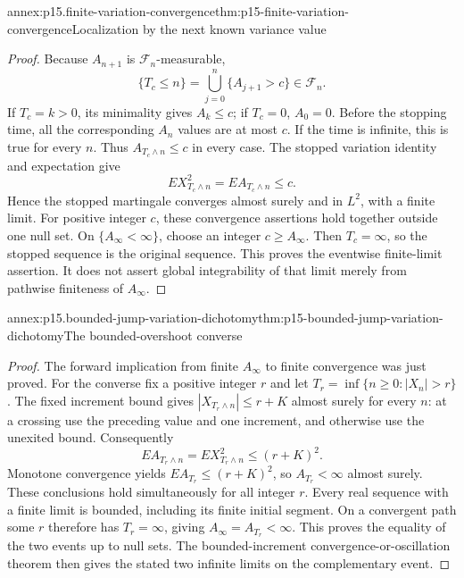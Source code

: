 \begin{annexitem}{annex:p15.finite-variation-convergence}{thm:p15-finite-variation-convergence}{Localization by the next known variance value}
\begin{proof}
Because \(A_{n+1}\) is \(\mathcal F_n\)-measurable,
\[
                 \{T_c\leq n\}
                    =\bigcup_{j=0}^n\{A_{j+1}>c\}\in\mathcal F_n.
\]
If \(T_c=k>0\), its minimality gives \(A_k\leq c\);
if \(T_c=0\), \(A_0=0\).
Before the stopping time, all the corresponding \(A_n\) values
are at most \(c\). If the time is infinite, this is true
for every \(n\). Thus \(A_{T_c\wedge n}\leq c\) in every case.
The stopped variation identity and expectation give
\[
                             EX_{T_c\wedge n}^2
                                  =EA_{T_c\wedge n}\leq c.
\]
Hence the stopped martingale converges almost surely and in
\(L^2\), with a finite limit.
For positive integer \(c\), these convergence assertions hold
together outside one null set.
On \(\{A_\infty<\infty\}\), choose an integer \(c\geq A_\infty\).
Then \(T_c=\infty\), so the stopped sequence is the original
sequence. This proves the eventwise finite-limit assertion.
It does not assert global integrability of that limit merely
from pathwise finiteness of \(A_\infty\).
\end{proof}
\end{annexitem}

\begin{annexitem}{annex:p15.bounded-jump-variation-dichotomy}{thm:p15-bounded-jump-variation-dichotomy}{The bounded-overshoot converse}
\begin{proof}
The forward implication from finite \(A_\infty\) to finite
convergence was just proved.
For the converse fix a positive integer \(r\) and let
\(T_r=\inf\{n\geq0:|X_n|>r\}\).
The fixed increment bound gives
\(|X_{T_r\wedge n}|\leq r+K\) almost surely for every \(n\):
at a crossing use the preceding value and one increment,
and otherwise use the unexited bound.
Consequently
\[
                   EA_{T_r\wedge n}=EX_{T_r\wedge n}^2
                                              \leq(r+K)^2.
\]
Monotone convergence yields \(EA_{T_r}\leq(r+K)^2\), so
\(A_{T_r}<\infty\) almost surely.
These conclusions hold simultaneously for all integer \(r\).
Every real sequence with a finite limit is bounded, including
its finite initial segment. On a convergent path some \(r\)
therefore has \(T_r=\infty\), giving \(A_\infty=A_{T_r}<\infty\).
This proves the equality of the two events up to null sets.
The bounded-increment convergence-or-oscillation theorem then
gives the stated two infinite limits on the complementary event.
\end{proof}
\end{annexitem}

